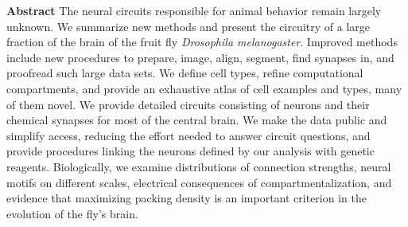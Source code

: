 \documentclass{article}
\begin{document}
\noindent\textbf{Abstract} The neural circuits responsible for animal behavior remain largely unknown. We summarize new methods and present the circuitry of a large fraction of the brain of the fruit fly \emph{Drosophila melanogaster}. Improved methods include new procedures to prepare, image, align, segment, find synapses in, and proofread such large data sets. We define cell types, refine computational compartments, and provide an exhaustive atlas of cell examples and types, many of them novel. We provide detailed circuits consisting of neurons and their chemical synapses for most of the central brain. We make the data public and simplify access, reducing the effort needed to answer circuit questions, and provide procedures linking the neurons defined by our analysis with genetic reagents. Biologically, we examine distributions of connection strengths, neural motifs on different scales, electrical consequences of compartmentalization, and evidence that maximizing packing density is an important criterion in the evolution of the fly’s brain.
\end{document}

